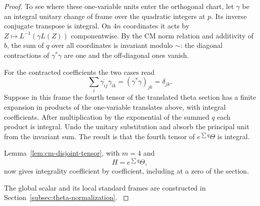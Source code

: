 \begin{proof}

To see where these one-variable units enter the orthogonal
chart, let \(\gamma\) be an integral unitary change of frame
over the quadratic integers at \(p\). Its inverse conjugate
transpose is integral. On \(4n\) coordinates it acts by
\(Z\mapsto L^{-1}(\gamma L(Z))\) componentwise. By the CM
norm relation and additivity of \(b\), the sum of \(q\) over
all coordinates is invariant modulo \(\sim\): the diagonal
contractions of \(\gamma^*\gamma\) are one and the off-diagonal
ones vanish.

For the contracted coefficients the two cases read
\[
  \sum_i\overline{\gamma_{ij}}\gamma_{ik}=(\gamma^*\gamma)_{jk}=\delta_{jk}.
\]
 Suppose in this frame the fourth tensor of the
translated theta section has a finite expansion in products
of the one-variable translates above, with integral coefficients.
After multiplication by the exponential of the summed \(q\)
each product is integral. Undo the unitary substitution and
absorb the principal unit from the invariant sum. The result
is that the fourth tensor of \(e^{\sum q}\Theta\) is integral.

Lemma~\ref{lem:cm-disjoint-tensor}, with \(m=4\) and 
\[
  H=e^{\sum q}\Theta,
\]
now gives integrality coefficient by coefficient, including at a zero
of the section.

The global scalar and its local standard frames are constructed in Section~\ref{subsec:theta-normalization}.
\label{cor:cm-models-1}
\end{proof}
